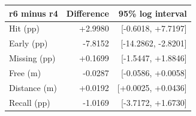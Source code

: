 \begin{tabular}{lrr}
\toprule
r6 minus r4 & Difference & 95\% log interval \\
\midrule
Hit (pp) & +2.9980 & [-0.6018, +7.7197] \\
Early (pp) & -7.8152 & [-14.2862, -2.8201] \\
Missing (pp) & +0.1699 & [-1.5447, +1.8846] \\
Free (m) & -0.0287 & [-0.0586, +0.0058] \\
Distance (m) & +0.0192 & [+0.0025, +0.0436] \\
Recall (pp) & -1.0169 & [-3.7172, +1.6730] \\
\bottomrule
\end{tabular}
